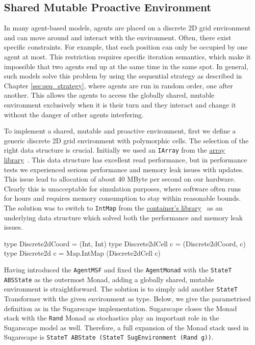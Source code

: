 \subsection{Shared Mutable Proactive Environment}
In many agent-based models, agents are placed on a discrete 2D grid environment and can move around and interact with the environment. Often, there exist specific constraints. For example, that each position can only be occupied by one agent at most. This restriction requires specific iteration semantics, which make it impossible that two agents end up at the same time in the same spot. In general, such models solve this problem by using the sequential strategy as described in Chapter \ref{sec:seq_strategy}, where agents are run in random order, one after another. This allows the agents to access the globally shared, mutable environment exclusively when it is their turn and they interact and change it without the danger of other agents interfering.

To implement a shared, mutable and proactive environment, first we define a generic discrete 2D grid environment with polymorphic cells. The selection of the right data structure is crucial. Initially we used an \texttt{IArray} from the \href{http://hackage.haskell.org/package/array}{array library}~\cite{array_hackage}. This data structure has excellent read performance, but in performance tests we experienced serious performance and memory leak issues with updates. This issue lead to allocation of about 40 MByte per second on our hardware. Clearly this is unacceptable for simulation purposes, where software often runs for hours and requires memory consumption to stay within reasonable bounds. The solution was to switch to \texttt{IntMap} from the \href{http://hackage.haskell.org/package/containers}{container's library}~\cite{containers_library} as an underlying data structure which solved both the performance and memory leak issues.

\begin{HaskellCode}
type Discrete2dCoord  = (Int, Int)
type Discrete2dCell c = (Discrete2dCoord, c)
type Discrete2d c     = Map.IntMap (Discrete2dCell c)
\end{HaskellCode}

Having introduced the \texttt{AgentMSF} and fixed the \texttt{AgentMonad} with the \texttt{StateT ABSState} as the outermost Monad, adding a globally shared, mutable environment is straightforward. The solution is to simply add another \texttt{StateT} Transformer with the given environment as type. Below, we give the parametrised definition as in the Sugarscape implementation. Sugarscape closes the Monad stack with the \texttt{Rand} Monad as stochastics play an important role in the Sugarscape model as well. Therefore, a full expansion of the Monad stack used in Sugarscape is \texttt{StateT ABState (StateT SugEnvironment (Rand g))}.

